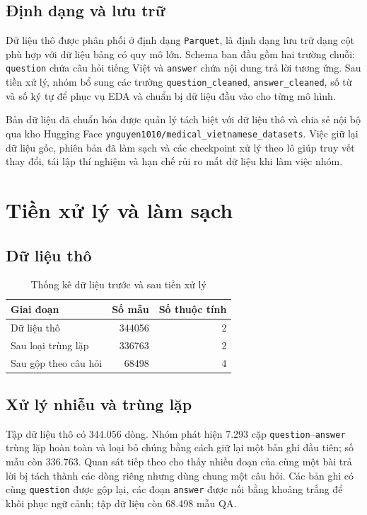 \documentclass[12pt,a4paper,oneside]{report}
\begin{document}
\subsection{Định dạng và lưu trữ}
Dữ liệu thô được phân phối ở định dạng \texttt{Parquet}, là định dạng lưu trữ dạng cột phù hợp với dữ liệu bảng có quy mô lớn. Schema ban đầu gồm hai trường chuỗi: \texttt{question} chứa câu hỏi tiếng Việt và \texttt{answer} chứa nội dung trả lời tương ứng. Sau tiền xử lý, nhóm bổ sung các trường \texttt{question\_cleaned}, \texttt{answer\_cleaned}, số từ và số ký tự để phục vụ EDA và chuẩn bị dữ liệu đầu vào cho từng mô hình.

Bản dữ liệu đã chuẩn hóa được quản lý tách biệt với dữ liệu thô và chia sẻ nội bộ qua kho Hugging Face \texttt{ynguyen1010/medical\_vietnamese\_datasets}. Việc giữ lại dữ liệu gốc, phiên bản đã làm sạch và các checkpoint xử lý theo lô giúp truy vết thay đổi, tái lập thí nghiệm và hạn chế rủi ro mất dữ liệu khi làm việc nhóm.

\section{Tiền xử lý và làm sạch}
\subsection{Dữ liệu thô}
\begin{table}[H]
\centering
\caption{Thống kê dữ liệu trước và sau tiền xử lý}
\label{tab:data-size}
\begin{tabular}{lrr}
\toprule
\textbf{Giai đoạn} & \textbf{Số mẫu} & \textbf{Số thuộc tính}\\
\midrule
Dữ liệu thô & 344056 & 2\\
Sau loại trùng lặp & 336763 & 2\\
Sau gộp theo câu hỏi & 68498 & 4\\
\bottomrule
\end{tabular}
\end{table}

\subsection{Xử lý nhiễu và trùng lặp}
Tập dữ liệu thô có 344.056 dòng. Nhóm phát hiện 7.293 cặp \texttt{question}--\texttt{answer} trùng lặp hoàn toàn và loại bỏ chúng bằng cách giữ lại một bản ghi đầu tiên; số mẫu còn 336.763. Quan sát tiếp theo cho thấy nhiều đoạn của cùng một bài trả lời bị tách thành các dòng riêng nhưng dùng chung một câu hỏi. Các bản ghi có cùng \texttt{question} được gộp lại, các đoạn \texttt{answer} được nối bằng khoảng trắng để khôi phục ngữ cảnh; tập dữ liệu còn 68.498 mẫu QA.
\end{document}

